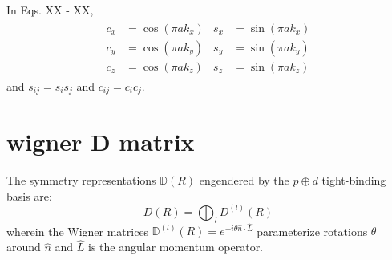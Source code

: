 \documentclass[twocolumn,showpacs,preprintnumbers,superscriptaddress,prb,floatfix,aps,10pt]{revtex4-1}
\newcommand*{\wignerD}{\mathbb{D}(R)}
\newcommand*{\wignerDl}{\mathbb{D}^{(l)}(R)}
\begin{document}
In Eqs. XX - XX,
\begin{align}
\begin{split}
c_x &= \cos(\pi a k_x) \\
c_y &= \cos(\pi a k_y) \\
c_z &= \cos(\pi a k_z)
\end{split}
\begin{split}
s_x &= \sin(\pi a k_x) \\
s_y &= \sin(\pi a k_y) \\
s_z &= \sin(\pi a k_z)
\end{split}
\end{align}
and
$s_{ij} = s_i s_j$ and $c_{ij} = c_i c_j$.





%
%
\section{wigner D matrix} \label{appendix:wigner}

The symmetry representations $\wignerD$ engendered by the $p \oplus d$ tight-binding basis are:
\begin{equation}
D(R) = \bigoplus_l D^{(l)}(R)
\end{equation}
wherein the Wigner matrices $\wignerDl =  e^{-i\theta\hat{n}\cdot\hat{L}}$ parameterize rotations $\theta$ around $\hat{n}$ and $\hat{L}$ is the angular momentum operator. %
\end{document}
